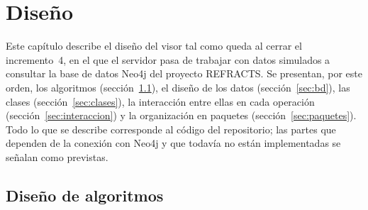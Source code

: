 %
%
%

\chapter{Diseño}
\label{cap:diseno}

Este capítulo describe el diseño del visor tal como queda al cerrar el incremento~4, en el que el servidor pasa de trabajar con datos simulados a consultar la base de datos Neo4j del proyecto REFRACTS. Se presentan, por este orden, los algoritmos (sección~\ref{sec:algoritmos}), el diseño de los datos (sección~\ref{sec:bd}), las clases (sección~\ref{sec:clases}), la interacción entre ellas en cada operación (sección~\ref{sec:interaccion}) y la organización en paquetes (sección~\ref{sec:paquetes}). Todo lo que se describe corresponde al código del repositorio; las partes que dependen de la conexión con Neo4j y que todavía no están implementadas se señalan como previstas.

\section{Diseño de algoritmos}
\label{sec:algoritmos}

